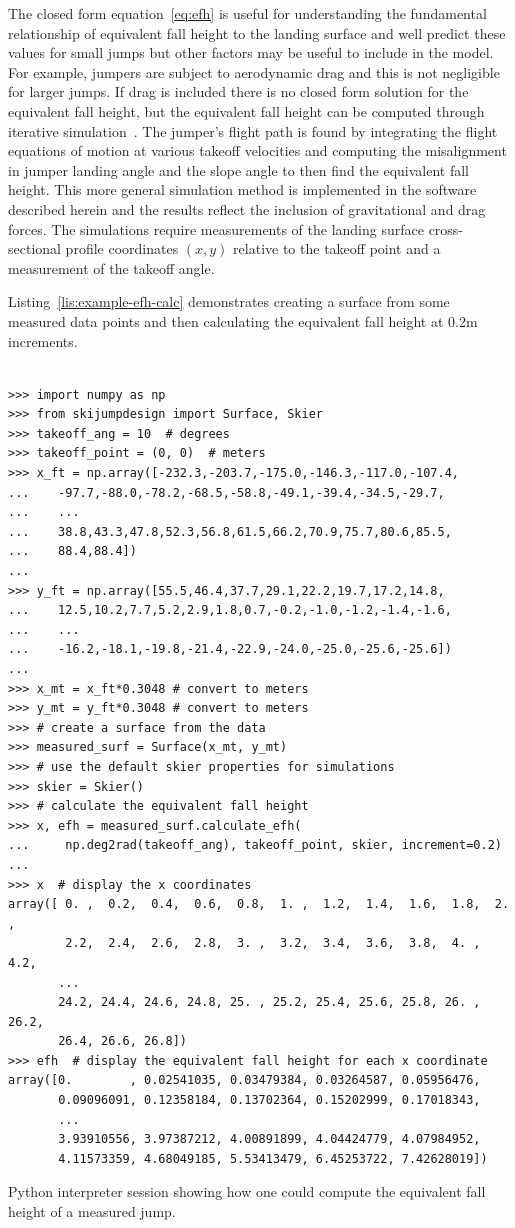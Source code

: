 \documentclass[smallextended]{svjour3}       %
\begin{document}
%
The closed form equation~\ref{eq:efh} is useful for understanding the fundamental
relationship of equivalent fall height to the landing surface and well predict
these values for small jumps but other factors may be useful to include in the
model. For example, jumpers are subject to aerodynamic drag and this is not
negligible for larger jumps. If drag is included there is no closed form
solution for the equivalent fall height, but the equivalent fall height can be
computed through iterative simulation~\cite{Levy2015}. The jumper's flight path
is found by integrating the flight equations of motion at various takeoff
velocities and computing the misalignment in jumper landing angle and the slope
angle to then find the equivalent fall height. This more general simulation
method is implemented in the software described herein and the results reflect
the inclusion of gravitational and drag forces. The simulations require
measurements of the landing surface cross-sectional profile coordinates $(x,y)$
relative to the takeoff point and a measurement of the takeoff angle.

Listing~\ref{lis:example-efh-calc} demonstrates creating a surface from some
measured data points and then calculating the equivalent fall height at
0.2\si{\meter} increments.
%
\begin{listing*}
  \begin{verbatim}

>>> import numpy as np
>>> from skijumpdesign import Surface, Skier
>>> takeoff_ang = 10  # degrees
>>> takeoff_point = (0, 0)  # meters
>>> x_ft = np.array([-232.3,-203.7,-175.0,-146.3,-117.0,-107.4,
...    -97.7,-88.0,-78.2,-68.5,-58.8,-49.1,-39.4,-34.5,-29.7,
...    ...
...    38.8,43.3,47.8,52.3,56.8,61.5,66.2,70.9,75.7,80.6,85.5,
...    88.4,88.4])
...
>>> y_ft = np.array([55.5,46.4,37.7,29.1,22.2,19.7,17.2,14.8,
...    12.5,10.2,7.7,5.2,2.9,1.8,0.7,-0.2,-1.0,-1.2,-1.4,-1.6,
...    ...
...    -16.2,-18.1,-19.8,-21.4,-22.9,-24.0,-25.0,-25.6,-25.6])
...
>>> x_mt = x_ft*0.3048 # convert to meters
>>> y_mt = y_ft*0.3048 # convert to meters
>>> # create a surface from the data
>>> measured_surf = Surface(x_mt, y_mt)
>>> # use the default skier properties for simulations
>>> skier = Skier()
>>> # calculate the equivalent fall height
>>> x, efh = measured_surf.calculate_efh(
...     np.deg2rad(takeoff_ang), takeoff_point, skier, increment=0.2)
...
>>> x  # display the x coordinates
array([ 0. ,  0.2,  0.4,  0.6,  0.8,  1. ,  1.2,  1.4,  1.6,  1.8,  2. ,
        2.2,  2.4,  2.6,  2.8,  3. ,  3.2,  3.4,  3.6,  3.8,  4. ,  4.2,
       ...
       24.2, 24.4, 24.6, 24.8, 25. , 25.2, 25.4, 25.6, 25.8, 26. , 26.2,
       26.4, 26.6, 26.8])
>>> efh  # display the equivalent fall height for each x coordinate
array([0.        , 0.02541035, 0.03479384, 0.03264587, 0.05956476,
       0.09096091, 0.12358184, 0.13702364, 0.15202999, 0.17018343,
       ...
       3.93910556, 3.97387212, 4.00891899, 4.04424779, 4.07984952,
       4.11573359, 4.68049185, 5.53413479, 6.45253722, 7.42628019])
  \end{verbatim}
  \caption{Python interpreter session showing how one could compute the
  equivalent fall height of a measured jump.}
  \label{lis:example-efh-calc}
\end{listing*}
\end{document}
